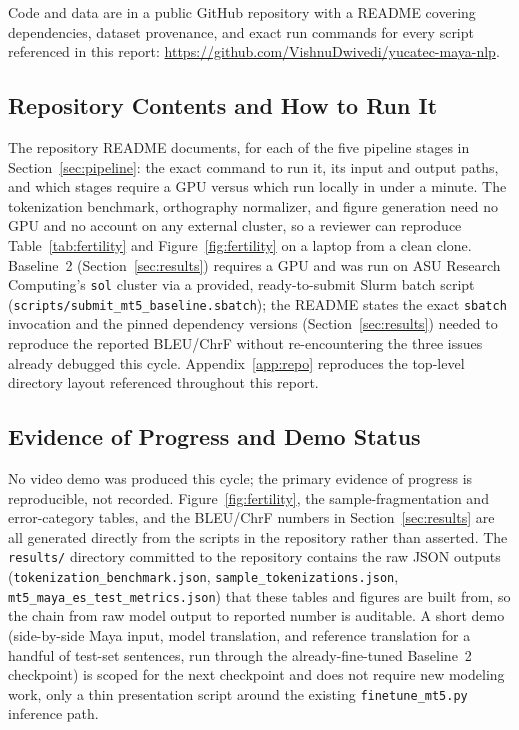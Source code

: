 \documentclass[11pt]{article}
\begin{document}
Code and data are in a public GitHub repository with a README covering
dependencies, dataset provenance, and exact run commands for every script
referenced in this report:
\url{https://github.com/VishnuDwivedi/yucatec-maya-nlp}.

\subsection{Repository Contents and How to Run It}

The repository README documents, for each of the five pipeline stages in
Section~\ref{sec:pipeline}: the exact command to run it, its input and output
paths, and which stages require a GPU versus which run locally in under a
minute. The tokenization benchmark, orthography normalizer, and figure
generation need no GPU and no account on any external cluster, so a reviewer
can reproduce Table~\ref{tab:fertility} and Figure~\ref{fig:fertility} on a
laptop from a clean clone. Baseline~2 (Section~\ref{sec:results}) requires a
GPU and was run on ASU Research Computing's \texttt{sol} cluster via a
provided, ready-to-submit Slurm batch script
(\texttt{scripts/submit\_mt5\_baseline.sbatch}); the README states the exact
\texttt{sbatch} invocation and the pinned dependency versions
(Section~\ref{sec:results}) needed to reproduce the reported BLEU/ChrF
without re-encountering the three issues already debugged this cycle.
Appendix~\ref{app:repo} reproduces the top-level directory layout referenced
throughout this report.

\subsection{Evidence of Progress and Demo Status}

No video demo was produced this cycle; the primary evidence of progress is
reproducible, not recorded. Figure~\ref{fig:fertility}, the
sample-fragmentation and error-category tables, and the BLEU/ChrF numbers in
Section~\ref{sec:results} are all generated directly from the scripts in the
repository rather than asserted. The \texttt{results/} directory committed to
the repository contains the raw JSON outputs
(\texttt{tokenization\_benchmark.json}, \texttt{sample\_tokenizations.json},
\texttt{mt5\_maya\_es\_test\_metrics.json}) that these tables and figures are
built from, so the chain from raw model output to reported number is
auditable. A short demo (side-by-side Maya input, model translation, and
reference translation for a handful of test-set sentences, run through the
already-fine-tuned Baseline~2 checkpoint) is scoped for the next
checkpoint and does not require new modeling work, only a thin
presentation script around the existing \texttt{finetune\_mt5.py} inference
path.
\end{document}
